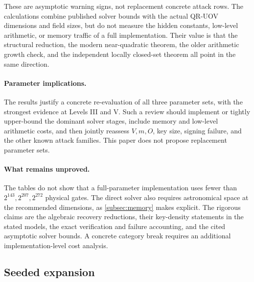 \documentclass[11pt,a4paper]{article}
\theoremstyle{definition}
\theoremstyle{remark}
\begin{document}
These are asymptotic warning signs, not replacement concrete attack rows.  The calculations combine published solver bounds with the actual QR-UOV dimensions and field sizes, but do not measure the hidden constants, low-level arithmetic, or memory traffic of a full implementation.  Their value is that the structural reduction, the modern near-quadratic theorem, the older arithmetic growth check, and the independent locally closed-set theorem all point in the same direction.

\paragraph{Parameter implications.}
The results justify a concrete re-evaluation of all three parameter sets, with the strongest evidence at Levels III and V.  Such a review should implement or tightly upper-bound the dominant solver stages, include memory and low-level arithmetic costs, and then jointly reassess $V,m,O$, key size, signing failure, and the other known attack families.  This paper does not propose replacement parameter sets.

\paragraph{What remains unproved.}
The tables do not show that a full-parameter implementation uses fewer than $2^{143},2^{207},2^{272}$ physical gates.  The direct solver also requires astronomical space at the recommended dimensions, as \cref{subsec:memory} makes explicit.  The rigorous claims are the algebraic recovery reductions, their key-density statements in the stated models, the exact verification and failure accounting, and the cited asymptotic solver bounds.  A concrete category break requires an additional implementation-level cost analysis.

\subsection{Seeded expansion}
\end{document}
